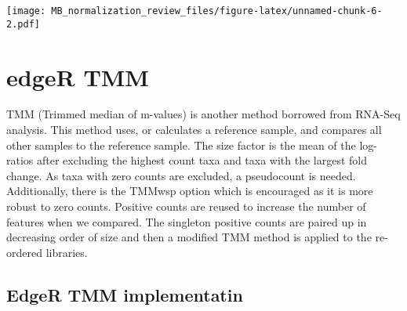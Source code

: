 \documentclass[
]{book}
\begin{document}
\texttt{[image: MB\_normalization\_review\_files/figure-latex/unnamed-chunk-6-2.pdf]}

\hypertarget{edger-tmm}{%
\chapter{edgeR TMM}\label{edger-tmm}}

TMM (Trimmed median of m-values) is another method borrowed from RNA-Seq analysis. This method uses, or calculates a reference sample, and compares all other samples to the reference sample. The size factor is the mean of the log-ratios after excluding the highest count taxa and taxa with the largest fold change. As taxa with zero counts are excluded, a pseudocount is needed. Additionally, there is the TMMwsp option which is encouraged as it is more robust to zero counts. Positive counts are reused to increase the number of features when we compared. The singleton positive counts are paired up in decreasing order of size and then a modified TMM method is applied to the re-ordered libraries.

\hypertarget{edger-tmm-implementatin}{%
\section{EdgeR TMM implementatin}\label{edger-tmm-implementatin}}
\end{document}
